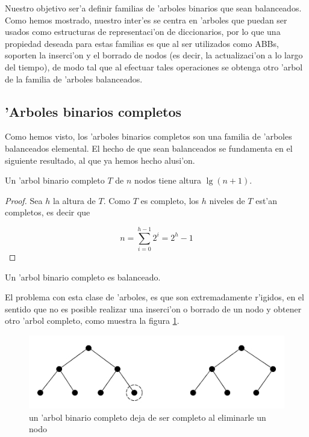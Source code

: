 Nuestro objetivo ser'a definir familias de 'arboles binarios que sean balanceados. Como hemos mostrado, nuestro inter'es se centra en 'arboles que puedan ser usados como estructuras de representaci'on de diccionarios, por lo que una propiedad deseada para estas familias es que al ser utilizados como ABBs, soporten la inserci'on y el borrado de nodos (es decir, la actualizaci'on a lo largo del tiempo), de modo tal que al efectuar tales operaciones se obtenga otro 'arbol de la familia de 'arboles balanceados. %

\subsection{'Arboles binarios completos}

Como hemos visto, los 'arboles binarios completos son una familia de 'arboles balanceados elemental. El hecho de que sean balanceados se fundamenta en el siguiente resultado, al que ya hemos hecho alusi'on.

\begin{teo}
Un 'arbol binario completo $T$ de $n$ nodos tiene altura $\lg(n + 1)$.

\begin{proof}
Sea $h$ la altura de $T$. Como $T$ es completo, los $h$ niveles de $T$ est'an completos, es decir que

\[n = \sum_{i = 0}^{h - 1}2^i = 2^h - 1\]
\end{proof}
\end{teo}

\begin{coro}
Un 'arbol binario completo es balanceado.
\end{coro}

El problema con esta clase de 'arboles, es que son extremadamente r'igidos, en el sentido que no es posible realizar una inserci'on o borrado de un nodo y obtener otro 'arbol completo, como muestra la figura \ref{fig3}.

\begin{figure}[h]
	\begin{center}
	\includegraphics[scale=0.6]{imagenes/fig3.jpg}
	\end{center}
	\caption{un 'arbol binario completo deja de ser completo al eliminarle un nodo}
	\label{fig3}
\end{figure}

